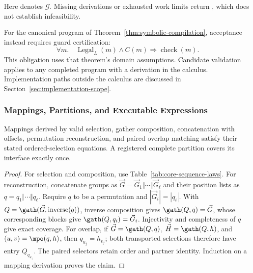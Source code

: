 Here  denotes $\mathcal G$. Missing derivations or exhausted
work limits return , which does not establish infeasibility.

For the canonical program of Theorem~\ref{thm:symbolic-compilation},
acceptance instead requires guard certification:
\begin{equation}
 \forall m.\quad \operatorname{Legal}_L(m)\land C(m)
 \Rightarrow\operatorname{check}(m).
 \label{eq:guard-feasibility}
\end{equation}
This obligation uses that theorem's domain assumptions. Candidate
validation applies to any completed program with a derivation in the
calculus. Implementation paths outside the calculus are discussed in
Section~\ref{sec:implementation-scope}.

\subsubsection{Mappings, Partitions, and Executable Expressions}
\begin{lemma}
\label{lem:validated-mappings}
Mappings derived by valid selection, gather composition, concatenation
with offsets, permutation reconstruction, and paired overlap matching
satisfy their stated ordered-selection equations. A registered complete
partition covers its interface exactly once.
\end{lemma}
\begin{proof}
For selection and composition, use Table~\ref{tab:core-sequence-laws}.
For reconstruction, concatenate groups as $\vec G=\vec G_1\Vert\cdots\Vert \vec G_\ell$
and their position lists as $q=q_1\Vert\cdots\Vert q_\ell$. Require $q$ to
be a permutation and $|\vec G_i|=|q_i|$. With
$Q=\gath(\vec G,\operatorname{inverse}(q))$, inverse composition gives
$\gath(Q,q)=\vec G$, whose corresponding blocks give
$\gath(Q,q_i)=\vec G_i$. Injectivity and completeness of $q$ give exact coverage.
For overlap, if $\vec G=\gath(Q,q)$, $\vec H=\gath(Q,h)$, and
$(u,v)=\mpo(q,h)$, then $q_{u_j}=h_{v_j}$; both transported selections
therefore have entry $Q_{q_{u_j}}$. The paired selectors retain order and
partner identity. Induction on a mapping derivation proves the claim.
\end{proof}

